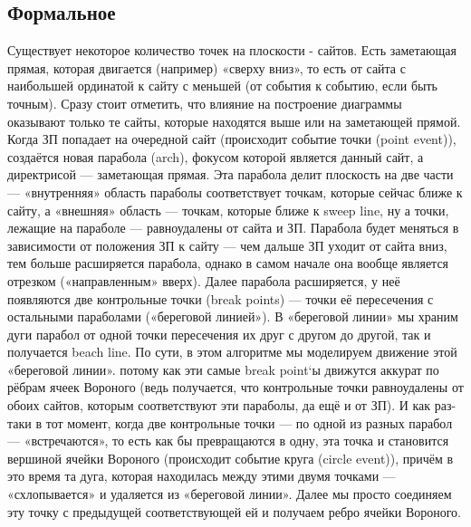 \documentclass[12 pt, a4paper]{article}
\begin{document}
\subsection{Формальное}
Существует некоторое количество точек на плоскости - сайтов. Есть заметающая прямая, которая двигается (например) «сверху вниз», то есть от сайта с наибольшей ординатой к сайту с меньшей (от события к событию, если быть точным). Сразу стоит отметить, что влияние на построение диаграммы оказывают только те сайты, которые находятся выше или на заметающей прямой.
Когда ЗП попадает на очередной сайт (происходит событие точки (point event)), создаётся новая парабола (arch), фокусом которой является данный сайт, а директрисой — заметающая прямая. Эта парабола делит плоскость на две части — «внутренняя» область параболы соответствует точкам, которые сейчас ближе к сайту, а «внешняя» область — точкам, которые ближе к sweep line, ну а точки, лежащие на параболе — равноудалены от сайта и ЗП. Парабола будет меняться в зависимости от положения ЗП к сайту — чем дальше ЗП уходит от сайта вниз, тем больше расширяется парабола, однако в самом начале она вообще является отрезком («направленным» вверх). Далее парабола расширяется, у неё появляются две контрольные точки (break points) — точки её пересечения с остальными параболами («береговой линией»). В «береговой линии» мы храним дуги парабол от одной точки пересечения их друг с другом до другой, так и получается beach line. По сути, в этом алгоритме мы моделируем движение этой «береговой линии». потому как эти самые break point`ы движутся аккурат по рёбрам ячеек Вороного (ведь получается, что контрольные точки равноудалены от обоих сайтов, которым соответствуют эти параболы, да ещё и от ЗП).
И как раз-таки в тот момент, когда две контрольные точки — по одной из разных парабол — «встречаются», то есть как бы превращаются в одну, эта точка и становится вершиной ячейки Вороного (происходит событие круга (circle event)), причём в это время та дуга, которая находилась между этими двумя точками — «схлопывается» и удаляется из «береговой линии». Далее мы просто соединяем эту точку с предыдущей соответствующей ей и получаем ребро ячейки Вороного.

\newpage
\end{document}
